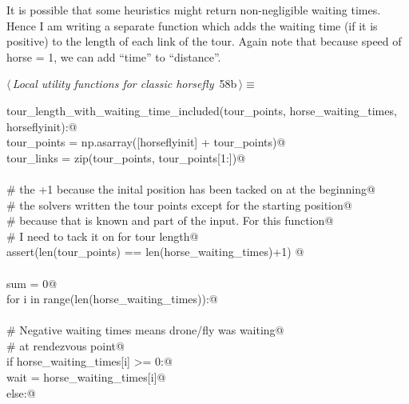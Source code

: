 \documentclass[11.5pt]{report}
\begin{document}
\vspace{-0.8cm}\newchunk It is possible that some heuristics might return non-negligible
      waiting times. Hence I am writing a separate function which
      adds the waiting time (if it is positive) to the length of 
      each link of the tour. Again note that because 
      speed of horse = 1, we can add ``time'' to ``distance''. 

\begin{flushleft} \small\label{scrap81}\raggedright\small
{} $\langle\,${\itshape Local utility functions for classic horsefly}\nobreak\ {\footnotesize {58b}}$\,\rangle\equiv$
\vspace{-1ex}
\begin{list}{}{} \item
\mbox{}\verb@def tour_length_with_waiting_time_included(tour_points, horse_waiting_times, horseflyinit):@\\
\mbox{}\verb@      tour_points   = np.asarray([horseflyinit] + tour_points)@\\
\mbox{}\verb@      tour_links    = zip(tour_points, tour_points[1:])@\\
\mbox{}\verb@@\\
\mbox{}\verb@      # the +1 because the inital position has been tacked on at the beginning@\\
\mbox{}\verb@      # the solvers written the tour points except for the starting position@\\
\mbox{}\verb@      # because that is known and part of the input. For this function@\\
\mbox{}\verb@      # I need to tack it on for tour length@\\
\mbox{}\verb@      assert(len(tour_points) == len(horse_waiting_times)+1) @\\
\mbox{}\verb@@\\
\mbox{}\verb@      sum = 0@\\
\mbox{}\verb@      for i in range(len(horse_waiting_times)):@\\
\mbox{}\verb@@\\
\mbox{}\verb@          # Negative waiting times means drone/fly was waiting@\\
\mbox{}\verb@          # at rendezvous point@\\
\mbox{}\verb@          if horse_waiting_times[i] >= 0:@\\
\mbox{}\verb@              wait = horse_waiting_times[i]@\\
\mbox{}\verb@          else:@\\

\end{list}
\end{flushleft}
\end{document}
